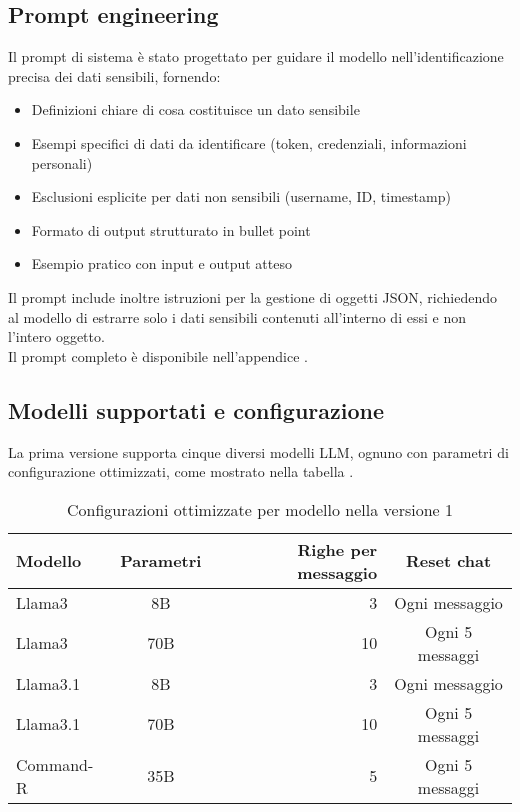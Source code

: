 \documentclass[12pt]{report}
\begin{document}
\subsection{Prompt engineering}
\label{subsec:ver1_prompt_engineering}

Il prompt di sistema è stato progettato per guidare il modello nell'identificazione precisa dei dati sensibili, fornendo:

\begin{itemize}
    \item Definizioni chiare di cosa costituisce un dato sensibile
    \item Esempi specifici di dati da identificare (token, credenziali, informazioni personali)
    \item Esclusioni esplicite per dati non sensibili (username, ID, timestamp)
    \item Formato di output strutturato in bullet point
    \item Esempio pratico con input e output atteso
\end{itemize}

Il prompt include inoltre istruzioni per la gestione di oggetti JSON, richiedendo al modello di estrarre solo i dati sensibili contenuti all'interno di essi e non l'intero oggetto. \\
Il prompt completo è disponibile nell'appendice .

\subsection{Modelli supportati e configurazione}
\label{subsec:ver1_modelli_supportati}

La prima versione supporta cinque diversi modelli LLM, ognuno con parametri di configurazione ottimizzati, come mostrato nella tabella .

\begin{table}[h!]
    \centering
    \begin{tabular}{|l|c|r|c|}
        \hline
        \textbf{Modello} & \textbf{Parametri} & \textbf{Righe per messaggio} & \textbf{Reset chat} \\ \hline
        Llama3           & 8B                 & 3                            & Ogni messaggio      \\ \hline
        Llama3           & 70B                & 10                           & Ogni 5 messaggi     \\ \hline
        Llama3.1         & 8B                 & 3                            & Ogni messaggio      \\ \hline
        Llama3.1         & 70B                & 10                           & Ogni 5 messaggi     \\ \hline
        Command-R        & 35B                & 5                            & Ogni 5 messaggi     \\ \hline
    \end{tabular}
    \caption{Configurazioni ottimizzate per modello nella versione 1}
    \label{tab:modelli_llm_ver1}
\end{table}
\end{document}
